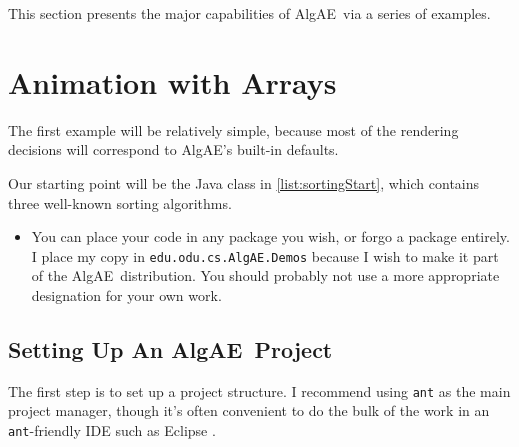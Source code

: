 \documentclass[11pt,titlepage]{book}
\newcommand{\algae}{{\sc AlgAE}}
\begin{document}
This section presents the major capabilities of \algae\ via a series
of examples. 


\section{Animation with Arrays}\label{sortingExample}

The first example will be relatively simple, because most of 
the rendering decisions will correspond to \algae's built-in defaults.

Our starting point will be the Java class in \autoref{list:sortingStart}, which 
contains three well-known sorting algorithms.


\begin{itemize}
\item You can place your code in any package you wish, or forgo a
  package entirely.  I place my copy in {\tt edu.odu.cs.AlgAE.Demos}
  because I wish to make it part of the \algae\ distribution.  You
  should probably not use a more appropriate designation for your own
  work.

\end{itemize}


\subsection{Setting Up An \algae\ Project}

The first step is to set up a project structure. I recommend using
\texttt{ant}\cite{Apache/ant} as the main project manager, though it's
often convenient to do the bulk of the work in an
\texttt{ant}-friendly IDE such as Eclipse \cite{Eclipse}.
\end{document}

